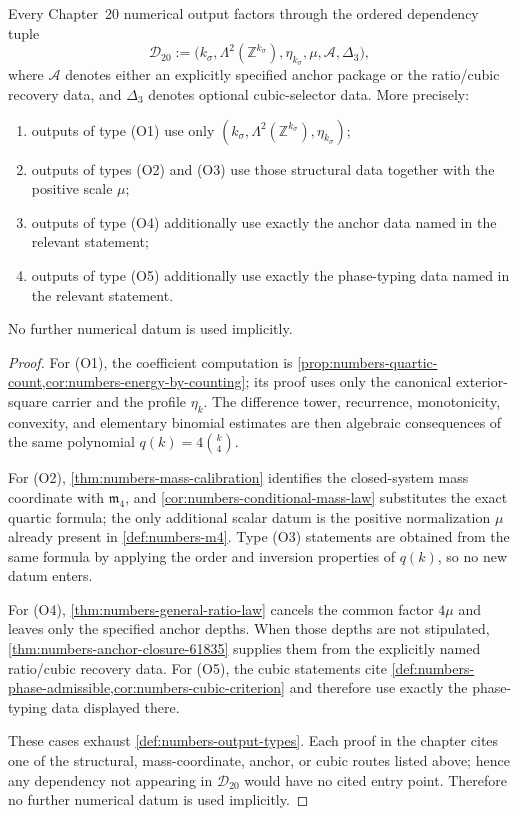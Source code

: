 \begin{theorem}
\label{thm:numbers-dependency-normal-form}
Every Chapter~20 numerical output factors through the ordered dependency
tuple
\[
  \mathcal D_{20}
  :=
  \bigl(
    k_\sigma,
    \Lambda^2(\mathbb Z^{k_\sigma}),
    \eta_{k_\sigma},
    \mu,
    \mathcal A,
    \Delta_3
  \bigr),
\]
where \(\mathcal A\) denotes either an explicitly specified anchor package
or the ratio/cubic recovery data, and \(\Delta_3\) denotes optional
cubic-selector data.  More precisely:
\begin{enumerate}[label=\textup{(\roman*)}]
\item outputs of type \textup{(O1)} use only
      \((k_\sigma,\Lambda^2(\mathbb Z^{k_\sigma}),\eta_{k_\sigma})\);
\item outputs of types \textup{(O2)} and \textup{(O3)} use those structural
      data together with the positive scale \(\mu\);
\item outputs of type \textup{(O4)} additionally use exactly the anchor data
      named in the relevant statement;
\item outputs of type \textup{(O5)} additionally use exactly the
      phase-typing data named in the relevant statement.
\end{enumerate}
No further numerical datum is used implicitly.
\end{theorem}

\begin{proof}
For \textup{(O1)}, the coefficient computation is
\cref{prop:numbers-quartic-count,cor:numbers-energy-by-counting}; its proof
uses only the canonical exterior-square carrier and the profile \(\eta_k\).
The difference tower, recurrence, monotonicity, convexity, and elementary
binomial estimates are then algebraic consequences of the same polynomial
\(q(k)=4\binom{k}{4}\).

For \textup{(O2)}, \cref{thm:numbers-mass-calibration} identifies the
closed-system mass coordinate with \(\mathfrak m_4\), and
\cref{cor:numbers-conditional-mass-law} substitutes the exact quartic formula;
the only additional scalar datum is the positive normalization \(\mu\) already
present in \cref{def:numbers-m4}.  Type \textup{(O3)} statements are obtained
from the same formula by applying the order and inversion properties of
\(q(k)\), so no new datum enters.

For \textup{(O4)}, \cref{thm:numbers-general-ratio-law} cancels the common
factor \(4\mu\) and leaves only the specified anchor depths.  When those
depths are not stipulated, \cref{thm:numbers-anchor-closure-61835} supplies
them from the explicitly named ratio/cubic recovery data.  For
\textup{(O5)}, the cubic statements cite
\cref{def:numbers-phase-admissible,cor:numbers-cubic-criterion} and therefore
use exactly the phase-typing data displayed there.

These cases exhaust \cref{def:numbers-output-types}.  Each proof in the
chapter cites one of the structural, mass-coordinate, anchor, or cubic routes
listed above; hence any dependency not appearing in \(\mathcal D_{20}\) would
have no cited entry point.  Therefore no further numerical datum is used
implicitly.
\end{proof}

